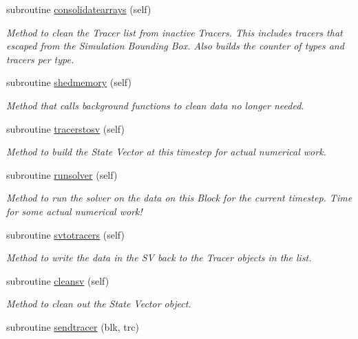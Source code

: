 \begin{DoxyCompactItemize}
subroutine \mbox{\hyperlink{namespaceblocks__mod_a25ff530b5125e4cee5b1f474b2491883}{consolidatearrays}} (self)
\begin{DoxyCompactList}\small\item\em Method to clean the Tracer list from inactive Tracers. This includes tracers that escaped from the Simulation Bounding Box. Also builds the counter of types and tracers per type. \end{DoxyCompactList}\item 
subroutine \mbox{\hyperlink{namespaceblocks__mod_a04a9fab577b0d1fb6cabefcde2b2180d}{shedmemory}} (self)
\begin{DoxyCompactList}\small\item\em Method that calls background functions to clean data no longer needed. \end{DoxyCompactList}\item 
subroutine \mbox{\hyperlink{namespaceblocks__mod_aa9c438503e619aa4352081ff46b15430}{tracerstosv}} (self)
\begin{DoxyCompactList}\small\item\em Method to build the State Vector at this timestep for actual numerical work. \end{DoxyCompactList}\item 
subroutine \mbox{\hyperlink{namespaceblocks__mod_a3245bdadbec6bb123c517921d1503b48}{runsolver}} (self)
\begin{DoxyCompactList}\small\item\em Method to run the solver on the data on this Block for the current timestep. Time for some actual numerical work! \end{DoxyCompactList}\item 
subroutine \mbox{\hyperlink{namespaceblocks__mod_a306a753acc9b8bb9107ebda481162180}{svtotracers}} (self)
\begin{DoxyCompactList}\small\item\em Method to write the data in the SV back to the Tracer objects in the list. \end{DoxyCompactList}\item 
subroutine \mbox{\hyperlink{namespaceblocks__mod_ab70bfe5cdce5a717115cfbac04f606a0}{cleansv}} (self)
\begin{DoxyCompactList}\small\item\em Method to clean out the State Vector object. \end{DoxyCompactList}\item 
subroutine \mbox{\hyperlink{namespaceblocks__mod_a5a9992de40470e417ec8e40e688f6a0e}{sendtracer}} (blk, trc)

\end{DoxyCompactItemize}
